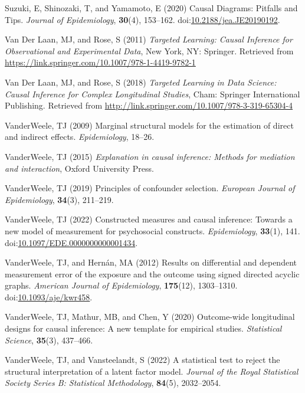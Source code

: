 \documentclass[
  single column]{article}
\newlength{\cslhangindent}
\newenvironment{CSLReferences}[2] %
 {\begin{list}{}{%
  \setlength{\itemindent}{0pt}
  \setlength{\leftmargin}{0pt}
  \setlength{\parsep}{0pt}
  \ifodd #1
   \setlength{\leftmargin}{\cslhangindent}
   \setlength{\itemindent}{-1\cslhangindent}
  \fi
  \setlength{\itemsep}{#2\baselineskip}}}
 {\end{list}}
\begin{document}
\begin{CSLReferences}{1}{0}
Suzuki, E, Shinozaki, T, and Yamamoto, E (2020) Causal Diagrams:
Pitfalls and Tips. \emph{Journal of Epidemiology}, \textbf{30}(4),
153--162.
doi:\href{https://doi.org/10.2188/jea.JE20190192}{10.2188/jea.JE20190192}.

Van Der Laan, MJ, and Rose, S (2011) \emph{Targeted Learning: Causal
Inference for Observational and Experimental Data}, New York, NY:
Springer. Retrieved from
\url{https://link.springer.com/10.1007/978-1-4419-9782-1}

Van Der Laan, MJ, and Rose, S (2018) \emph{Targeted Learning in Data
Science: Causal Inference for Complex Longitudinal Studies}, Cham:
Springer International Publishing. Retrieved from
\url{http://link.springer.com/10.1007/978-3-319-65304-4}

VanderWeele, TJ (2009) Marginal structural models for the estimation of
direct and indirect effects. \emph{Epidemiology}, 18--26.

VanderWeele, TJ (2015) \emph{Explanation in causal inference: Methods
for mediation and interaction}, Oxford University Press.

VanderWeele, TJ (2019) Principles of confounder selection.
\emph{European Journal of Epidemiology}, \textbf{34}(3), 211--219.

VanderWeele, TJ (2022) Constructed measures and causal inference:
Towards a new model of measurement for psychosocial constructs.
\emph{Epidemiology}, \textbf{33}(1), 141.
doi:\href{https://doi.org/10.1097/EDE.0000000000001434}{10.1097/EDE.0000000000001434}.

VanderWeele, TJ, and Hernán, MA (2012) Results on differential and
dependent measurement error of the exposure and the outcome using signed
directed acyclic graphs. \emph{American Journal of Epidemiology},
\textbf{175}(12), 1303--1310.
doi:\href{https://doi.org/10.1093/aje/kwr458}{10.1093/aje/kwr458}.

VanderWeele, TJ, Mathur, MB, and Chen, Y (2020) Outcome-wide
longitudinal designs for causal inference: A new template for empirical
studies. \emph{Statistical Science}, \textbf{35}(3), 437--466.

VanderWeele, TJ, and Vansteelandt, S (2022) A statistical test to reject
the structural interpretation of a latent factor model. \emph{Journal of
the Royal Statistical Society Series B: Statistical Methodology},
\textbf{84}(5), 2032--2054.


\end{CSLReferences}
\end{document}
